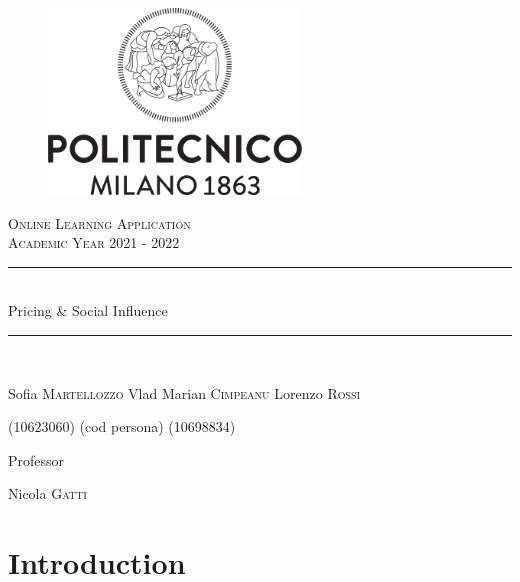 \documentclass{article}
\begin{document}
\begin{titlepage}
      \centering
      \begin{figure}
            \begin{center}
                  \includegraphics[width=0.6\textwidth]{img/logo_polimi.png}
            \end{center}
      \end{figure}
      \vfill
      {\scshape\LARGE Online Learning Application\\Academic Year 2021 - 2022 \par}
      
      
      \vfill
      \newcommand{\HRule}{\rule{\linewidth}{0.3mm}}
      \centering
      \HRule \\[0.4cm]
      \huge  Pricing \& Social Influence\\%
      \HRule \\
      \vspace{1cm}
      {\Large Sofia \textsc{Martellozzo} \quad  Vlad Marian \textsc{Cimpeanu}  \quad  Lorenzo \textsc{Rossi}\par}
      {\Large(10623060) \quad (cod persona) \quad (10698834) \par}
      \vfill
      {\large Professor\par
          Nicola \textsc{Gatti}}
\end{titlepage}


\newpage
\renewcommand\contentsname{Contents}
\tableofcontents

\newpage

\section*{Introduction}



\newpage
\end{document}
